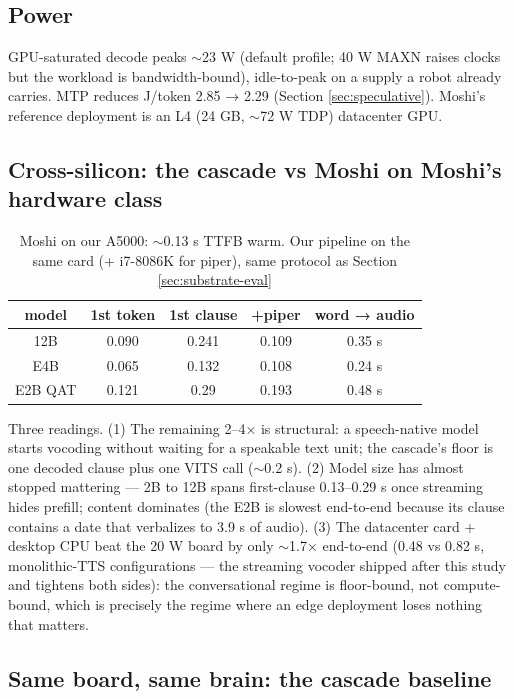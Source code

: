 \documentclass{article}
\begin{document}
\subsection{Power}

GPU-saturated decode peaks $\sim$23 W (default profile; 40 W MAXN raises clocks but the workload is bandwidth-bound), idle-to-peak on a supply a robot already carries. MTP reduces J/token 2.85 → 2.29 (Section \ref{sec:speculative}). Moshi's reference deployment is an L4 (24 GB, $\sim$72 W TDP) datacenter GPU.

\subsection{Cross-silicon: the cascade vs Moshi on Moshi's hardware class}
\label{sec:crosssilicon}

\begin{table}[H]
	\centering
	\small
	\begin{tabular}{ccccc}
		\toprule
		model  &  1st token & 1st clause & +piper & word → audio \\
		\midrule
		12B &  0.090& 0.241 & 0.109&0.35 s\\
		E4B & 0.065 & 0.132 & 0.108&0.24 s\\
		E2B QAT & 0.121& 0.29 & 0.193 	&0.48 s\\
		\bottomrule
	\end{tabular}
	\caption{Moshi on our A5000: $\sim$0.13 s TTFB warm. Our pipeline on the same card (+ i7-8086K for piper), same protocol as Section \ref{sec:substrate-eval}}
	\label{tab:pipeline}
\end{table}

Three readings. (1) The remaining 2–4× is structural: a speech-native model starts vocoding without waiting for a speakable text unit; the cascade's floor is one decoded clause plus one VITS call ($\sim$0.2 s). (2) Model size has almost stopped mattering — 2B to 12B spans first-clause 0.13–0.29 s once streaming hides prefill; content dominates (the E2B is slowest end-to-end because its clause contains a date that verbalizes to 3.9 s of audio). (3) The datacenter card + desktop CPU beat the 20 W board by only $\sim$1.7× end-to-end (0.48 vs 0.82 s, monolithic-TTS configurations — the streaming vocoder shipped after this study and tightens both sides): the conversational regime is floor-bound, not compute-bound, which is precisely the regime where an edge deployment loses nothing that matters.

\subsection{Same board, same brain: the cascade baseline}
\label{sec:hfcompare}
\end{document}
